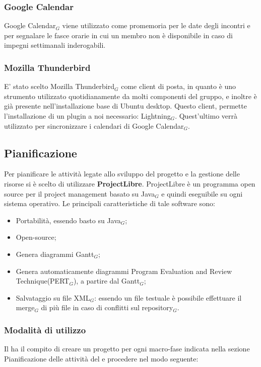 \subsubsection{Google Calendar}
Google Calendar$_G$ viene utilizzato come promemoria per le date degli incontri e per segnalare le fasce orarie in cui un membro non è disponibile in caso di impegni settimanali inderogabili.

\subsubsection{Mozilla Thunderbird}
	E' stato scelto Mozilla Thunderbird$_G$ come client di posta, in quanto è uno strumento utilizzato quotidianamente da molti componenti del gruppo, e inoltre è già presente nell'installazione base di Ubuntu desktop. Questo client, permette l'installazione di un plugin a noi necessario: Lightning$_G$. Quest'ultimo verrà utilizzato per sincronizzare i calendari di Google Calendar$_G$.

\subsection{Pianificazione}
Per pianificare le attività legate allo sviluppo del progetto e la gestione delle risorse si è scelto di utilizzare \textbf{ProjectLibre}.
ProjectLibre è un programma open source per il project management basato su
Java$_G$ e quindi eseguibile su ogni sistema operativo. Le principali caratteristiche di tale software sono:
\begin{itemize}
	\item Portabilità, essendo basto su Java$_G$;
	\item Open-source;
	\item Genera diagrammi Gantt$_G$;
	\item Genera automaticamente diagrammi Program Evaluation and Review Technique(PERT$_G$), a partire dal Gantt$_G$;
	\item Salvataggio su file XML$_G$: essendo un file testuale è possibile effettuare il merge$_G$ di più file in caso di conflitti sul repository$_G$.

\end{itemize}

\subsubsection{Modalità di utilizzo}
Il \ruoloResponsabile{} ha il compito di creare un progetto per ogni macro-fase indicata nella sezione Pianificazione delle attività del \PdP{} e procedere nel modo seguente:


